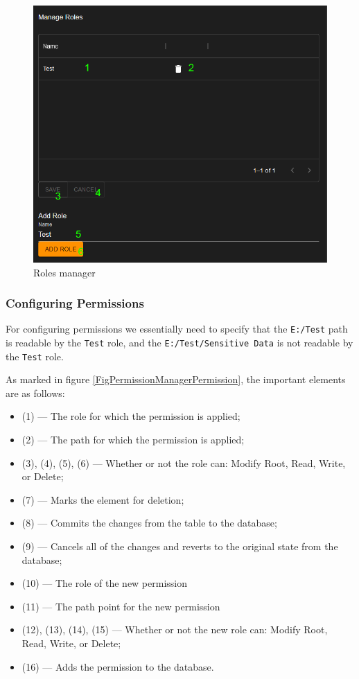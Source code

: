 \begin{figure}[htbp]
	\centering
		\includegraphics[scale=0.5]{./figures/chapter4/permission_manager_roles.png}
	\caption{Roles manager}
	\label{FigPermissionManagerRoles}
\end{figure}

\subsubsection{Configuring Permissions}
For configuring permissions we essentially need to specify that the \verb|E:/Test| path is readable by the \verb|Test| role, and the \verb|E:/Test/Sensitive Data| is not readable by the \verb|Test| role.

As marked in figure \ref{FigPermissionManagerPermission}, the important elements are as follows:
\begin{itemize}
	\item (1) --- The role for which the permission is applied;
	\item (2) --- The path for which the permission is applied;
	\item (3), (4), (5), (6) --- Whether or not the role can: Modify Root, Read, Write, or Delete;
	\item (7) --- Marks the element for deletion;
	\item (8) --- Commits the changes from the table to the database;
	\item (9) --- Cancels all of the changes and reverts to the original state from the database;
	\item (10) --- The role of the new permission
	\item (11) --- The path point for the new permission
	\item (12), (13), (14), (15) ---  Whether or not the new role can: Modify Root, Read, Write, or Delete;
	\item (16) --- Adds the permission to the database.
\end{itemize}

